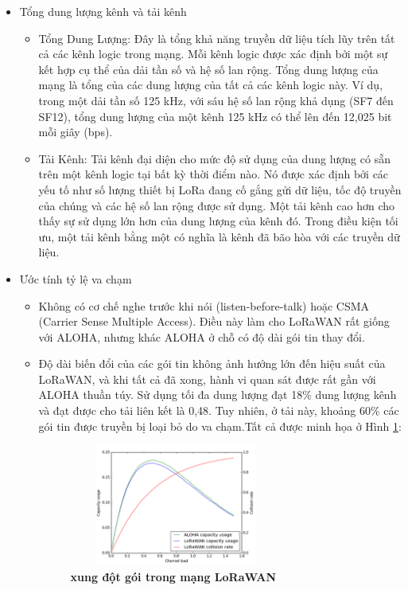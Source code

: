 \documentclass{article} %
\begin{document}
\begin{itemize}
		\item Tổng dung lượng kênh và tải kênh
		
		\begin{itemize}[label=$\ast$]
			\item Tổng Dung Lượng: Đây là tổng khả năng truyền dữ liệu tích lũy trên tất cả các kênh logic trong mạng. Mỗi kênh logic được xác định bởi một sự kết hợp cụ thể của dải tần số và hệ số lan rộng. Tổng dung lượng của mạng là tổng của các dung lượng của tất cả các kênh logic này. Ví dụ, trong một dải tần số 125 kHz, với sáu hệ số lan rộng khả dụng (SF7 đến SF12), tổng dung lượng của một kênh 125 kHz có thể lên đến 12,025 bit mỗi giây (bps).
			
			\item Tải Kênh: Tải kênh đại diện cho mức độ sử dụng của dung lượng có sẵn trên một kênh logic tại bất kỳ thời điểm nào. Nó được xác định bởi các yếu tố như số lượng thiết bị LoRa đang cố gắng gửi dữ liệu, tốc độ truyền của chúng và các hệ số lan rộng được sử dụng. Một tải kênh cao hơn cho thấy sự sử dụng lớn hơn của dung lượng của kênh đó. Trong điều kiện tối ưu, một tải kênh bằng một có nghĩa là kênh đã bão hòa với các truyền dữ liệu.
		\end{itemize}
		
		\item Ước tính tỷ lệ va chạm
		
		\begin{itemize}[label=$\ast$]
			
			\item Không có cơ chế nghe trước khi nói (listen-before-talk) hoặc CSMA (Carrier Sense Multiple Access). Điều này làm cho LoRaWAN rất giống với ALOHA, nhưng khác ALOHA ở chỗ có độ dài gói tin thay đổi.
			
			\item Độ dài biến đổi của các gói tin không ảnh hưởng lớn đến hiệu suất của LoRaWAN, và khi tất cả đã xong, hành vi quan sát được rất gần với ALOHA thuần túy. Sử dụng tối đa dung lượng đạt 18\% dung lượng kênh và đạt được cho tải liên kết là 0,48. Tuy nhiên, ở tải này, khoảng 60\% các gói tin được truyền bị loại bỏ do va chạm.Tất cả được minh họa ở Hình \ref{collision}:
			\begin{figure}[!ht]
				\centering
				\includegraphics[width=7cm,height=4cm]{Images/collision.png}
				\caption[xung đột gói trong mạng LoRaWAN \cite{augustin2016study}]{\bfseries \fontsize{12pt}{0pt}\selectfont xung đột gói trong mạng LoRaWAN \cite{augustin2016study}}
				\label{collision}
			\end{figure}    
		\end{itemize}
		
		
	\end{itemize}
	
\end{document}
